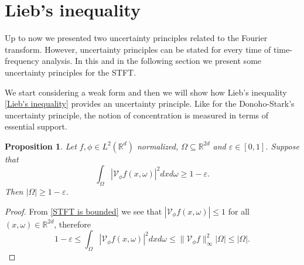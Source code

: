 \documentclass[corpo=11pt, stile=classica, tipotesi=custom,
greek, evenboxes, english]{toptesi}
\numberwithin{equation}{chapter}
\newtheorem{prop}[teo]{Proposition}
\theoremstyle{definition}
\theoremstyle{remark}
\newcommand{\R}{\mathbb{R}} %
\newcommand{\V}{\mathcal{V}} %
\begin{document}
\section{Lieb's inequality}\label{section Lieb's UP}
 Up to now we presented two uncertainty principles related to the Fourier transform. However, uncertainty principles can be stated for every time of time-frequency analysis. In this and in the following section we present some uncertainty principles for the STFT.

We start considering a weak form and then we will show how Lieb's inequality \eqref{Lieb's inequality} provides an uncertainty principle. Like for the Donoho-Stark's uncertainty principle, the notion of concentration is measured in terms of essential support. 
\begin{prop}\label{weak uncertainty principle for STFT}
	Let $f,\phi \in L^2(\R^d)$ normalized, $\Omega \subseteq \R^{2d}$ and $\varepsilon \in  [0,1]$. Suppose that
	\begin{equation*}
		\int_\Omega |\V_{\phi}f(x,\omega)|^2 dxd\omega \geq 1- \varepsilon.
	\end{equation*}
	Then $|\Omega| \geq 1- \varepsilon$.
\end{prop}
\begin{proof}
	From \eqref{STFT is bounded} we see that $|\V_{\phi}f(x,\omega)| \leq 1$ for all $(x,\omega) \in \R^{2d}$, therefore
	\begin{equation}\label{weak uncertainty principle for STFT formula}
		1-\varepsilon \leq \int_\Omega |\V_{\phi}f(x,\omega)|^2 dxd\omega \leq \|\V_{\phi}f\|_{\infty}^2 |\Omega| \leq |\Omega|.
	\end{equation}
\end{proof}
\end{document}
